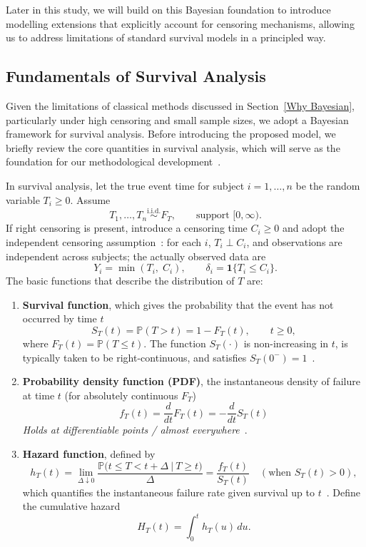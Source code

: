 Later in this study, we will build on this Bayesian foundation to introduce modelling extensions that explicitly account for censoring mechanisms, allowing us to address limitations of standard survival models in a principled way.


\subsection{Fundamentals of Survival Analysis} 
\label{Fundamentals of Survival Analysis}
Given the limitations of classical methods discussed in Section~\ref{Why Bayesian}, particularly under high censoring and small sample sizes, we adopt a Bayesian framework for survival analysis. Before introducing the proposed model, we briefly review the core quantities in survival analysis, which will serve as the foundation for our methodological development~\cite{kleinbaum1996survival}.

In survival analysis, let the true event time for subject $i=1,\dots,n$ be the random variable $T_i\ge 0$. Assume
$$
T_1,\ldots,T_n \stackrel{\text{i.i.d.}}{\sim} F_T,\qquad \text{support }[0,\infty).
$$
If right censoring is present, introduce a censoring time $C_i\ge 0$ and adopt the independent censoring assumption~\cite{kalbfleisch2002statistical}: for each $i$, $T_i\perp C_i$, and observations are independent across subjects; the actually observed data are
$$
Y_i=\min(T_i,\;C_i),\qquad \delta_i=\mathbf 1\{T_i\le C_i\}.
$$
The basic functions that describe the distribution of $T$ are:
\begin{enumerate}
    \item \textbf{Survival function}, which gives the probability that the event has not occurred by time $t$
   \begin{equation}
       S_T(t)=\mathbb P(T>t)=1-F_T(t),\qquad t\ge 0,
   \end{equation}
   where $F_T(t)=\mathbb P(T\le t)$. The function $S_T(\cdot)$ is non-increasing in $t$, is typically taken to be right-continuous, and satisfies $S_T(0^-)=1$~\cite{ibrahim2013bayesian}.
   \item \textbf{Probability density function (PDF)}, the instantaneous density of failure at time $t$ (for absolutely continuous $F_T$)
   \begin{equation}
   f_T(t)=\frac{d}{dt}F_T(t)=-\frac{d}{dt}S_T(t)
  \end{equation}
\noindent\textit{Holds at differentiable points / almost everywhere}~\cite{ibrahim2013bayesian,kleinbaum1996survival}.
   \item \textbf{Hazard function}, defined by
   \begin{equation}
        h_T(t)=\lim_{\Delta\downarrow 0}\frac{\mathbb P\big(t\le T<t+\Delta\ \big|\ T\ge t\big)}{\Delta}
          =\frac{f_T(t)}{S_T(t)}\quad(\text{when }S_T(t)>0),
   \end{equation}
   which quantifies the instantaneous failure rate given survival up to $t$~\cite{kalbfleisch2002statistical, ibrahim2013bayesian}. Define the cumulative hazard \begin{equation}
       H_T(t)=\int_0^{t} h_T(u)\,du.
   \end{equation}
\end{enumerate}

